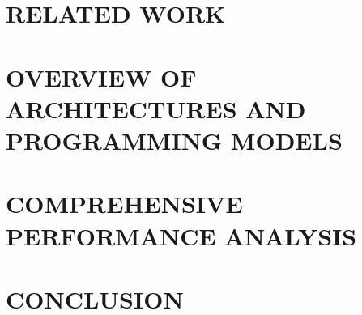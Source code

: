 \documentclass[10pt,pageno]{jpaper}
\begin{document}
\section{RELATED WORK}
\label{sec:RELATED_WORK}


\section{OVERVIEW OF ARCHITECTURES AND PROGRAMMING MODELS}
\label{sec:OVERVIEW}


\section{COMPREHENSIVE PERFORMANCE ANALYSIS}
\label{sec:PERFORMANCE}


\section{CONCLUSION}
\label{sec:CONCLUSION}




\end{document}
